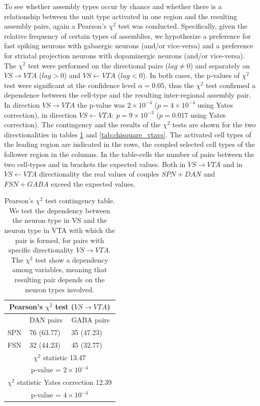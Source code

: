 To see whether assembly types occur by chance and whether there is a relationship between the unit type activated in one region and the resulting assembly pairs, again a Pearson's $\chi^2$ test was conducted. Specifically, given the relative frequency of certain types of assemblies, we hypothesize a preference for fast spiking neurons with gabaergic neurons (and/or vice-versa) and a preference for striatal projection neurons with dopaminergic neurons (and/or vice-versa). The $\chi^2$ test were performed on the directional pairs ($lag\neq0$) and separately on $VS\rightarrow VTA$ ($lag>0$) and $VS\leftarrow VTA$ ($lag<0$). In both cases, the p-values of $\chi^2$ test were significant at the confidence level $\alpha = 0.05$, thus the $\chi^2$ test confirmed a dependence between the cell-type and the resulting inter-regional assembly pair. In direction $VS\rightarrow VTA$ the p-value was $2\times10^{-4}$ ($p=4\times10^{-4}$ using Yates correction), in direction $VS\leftarrow VTA$: $p=9\times10^{-3}$ ($p=0.017$ using Yates correction). The contingency and the results of the $\chi^2$ tests are shown for the two directionalities in tables \ref{tab:chisquare_vsvta} and \ref{tab:chisquare_vtavs}. The activated cell types of the leading region are indicated in the rows,  the coupled selected cell types of the follower region in the columns. In the table-cells the number of pairs between the two cell-types and in brackets the expected values. Both in $VS\rightarrow VTA$ and in $VS\leftarrow VTA$ directionality the real values of couples $SPN+DAN$ and $FSN+GABA$ exceed the expected values.\\ 
\begin{table}[H]
\begin{tabular}{ |p{3cm}|p{3cm}|p{3cm}| }
 \hline
 \multicolumn{3}{|c|}{Pearson's $\chi^2$ test ($VS \rightarrow VTA$)} \\
 \hline
 & DAN pairs & GABA pairs\\
 \hline
 SPN & 76 (63.77) & 35 (47.23) \\
 \hline
 FSN & 32 (44.23) & 45 (32.77)\\
 \hline
 \multicolumn{3}{|c|}{$\chi^2$ statistic  13.47}\\
 \multicolumn{3}{|c|}{p-value = $2\times10^{-4}$}\\
 \hline
 \multicolumn{3}{|c|}{$\chi^2$ statistic Yates correction 12.39}\\
 \multicolumn{3}{|c|}{p-value = $4\times10^{-4}$}\\
 \hline
\end{tabular}
\caption{Pearson's $\chi^{2}$ test contingency table. We test the dependency between the neuron type in VS and the neuron type in VTA with which the pair is formed, for pairs with specific directionality $VS \rightarrow VTA$. The $\chi^2$ test show a dependency among variables, meaning that resulting pair depends on the neuron types involved.}
\label{tab:chisquare_vsvta}
\end{table}

